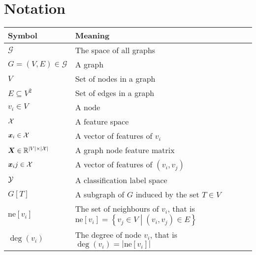 \chapter*{Notation}

\begin{tabular}{ll}
	\toprule
	\textbf{Symbol} & \textbf{Meaning} \\
	\midrule
	\( \mathcal{G} \) & The space of all graphs \\
	\( G = \left( V, E \right) \in \mathcal{G} \) & A graph \\
	\( V \) & Set of nodes in a graph \\
	\( E \subseteq V^2 \) & Set of edges in a graph \\
	\( v_i \in V \) & A node \\
	\( \mathcal{X} \) & A feature space \\
	\( \bm{x}_i \in \mathcal{X} \) & A vector of features of \( v_i \) \\
	\( \bm{X} \in \mathbb{R}^{\left\lvert V \right\rvert \times \left\lvert \mathcal{X} \right\rvert} \) & A graph node feature matrix	\\
	\( \bm{x}_ij \in \mathcal{X} \) & A vector of features of \( \left( v_i, v_j \right) \) \\
	\( \mathcal{Y} \) & A classification label space \\
	\( G \left[ T \right] \) & A subgraph of \( G \) induced by the set \( T \in V \) \\
	\( \mathrm{ne}[v_i] \) & The set of neighbours of \( v_i \), that is \( \mathrm{ne}[v_i] = \left\{ v_j \in V \middle| \left( v_i, v_j \right) \in E \right\} \) \\
	\( \deg \left( v_i \right) \) & The degree of node \( v_i \), that is \( \deg \left( v_i \right) = \left\lvert \mathrm{ne}[v_i] \right\rvert \) \\
	\bottomrule
\end{tabular}
